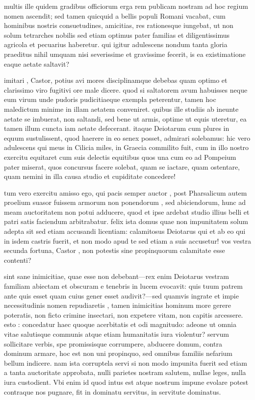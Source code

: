  multis ille quidem gradibus officiorum erga rem publicam nostram ad hoc regium nomen ascendit; sed tamen quicquid a bellis populi Romani vacabat, cum hominibus nostris consuetudines, amicitias, res rationesque iungebat, ut non solum tetrarches nobilis sed etiam optimus pater familias et diligentissimus agricola et pecuarius haberetur. qui igitur adulescens nondum tanta gloria praeditus nihil umquam nisi severissime et gravissime fecerit, is ea existimatione eaque aetate saltavit?

 imitari , Castor, potius avi mores disciplinamque debebas quam optimo et clarissimo viro fugitivi ore male dicere. quod si saltatorem avum habuisses neque eum virum unde pudoris pudicitiaeque exempla peterentur, tamen hoc maledictum minime in illam aetatem conveniret. quibus ille studiis ab ineunte aetate se imbuerat, non saltandi, sed bene ut armis, optime ut equis uteretur, ea tamen illum cuncta iam aetate defecerant. itaque Deiotarum cum plures in equum sustulissent, quod haerere in eo senex posset, admirari solebamus: hic vero adulescens qui meus in Cilicia miles, in Graecia commilito fuit, cum in illo nostro exercitu equitaret cum suis delectis equitibus quos una cum eo ad Pompeium pater miserat, quos concursus facere solebat, quam se iactare, quam ostentare, quam nemini in illa causa studio et cupiditate concedere!

 tum vero exercitu amisso ego, qui pacis semper auctor , post Pharsalicum autem proelium suasor fuissem armorum non ponendorum , sed abiciendorum, hunc ad meam auctoritatem non potui adducere, quod et ipse ardebat studio illius belli et patri satis faciendum arbitrabatur. felix ista domus quae non impunitatem solum adepta sit sed etiam accusandi licentiam: calamitosus Deiotarus qui et ab eo qui in isdem castris fuerit, et non modo apud te sed etiam a suis accusetur! vos vestra secunda fortuna, Castor , non potestis sine propinquorum calamitate esse contenti?

 sint sane inimicitiae, quae esse non debebant—rex enim Deiotarus vestram familiam abiectam et obscuram e tenebris in lucem evocavit: quis tuum patrem ante quis esset quam cuius gener esset audivit?—sed quamvis ingrate et impie necessitudinis nomen repudiaretis , tamen inimicitias hominum more gerere poteratis, non ficto crimine insectari, non expetere vitam, non capitis arcessere. esto : concedatur haec quoque acerbitatis et odi magnitudo: adeone ut omnia vitae salutisque communis atque etiam humanitatis iura violentur? servum sollicitare verbis, spe promissisque corrumpere, abducere domum, contra dominum armare, hoc est non uni propinquo, sed omnibus familiis nefarium bellum indicere. nam ista corruptela servi si non modo impunita fuerit sed etiam a tanta auctoritate approbata, nulli parietes nostram salutem, nullae leges, nulla iura custodient. Vbi enim id quod intus est atque nostrum impune evolare potest contraque nos pugnare, fit in dominatu servitus, in servitute dominatus.

